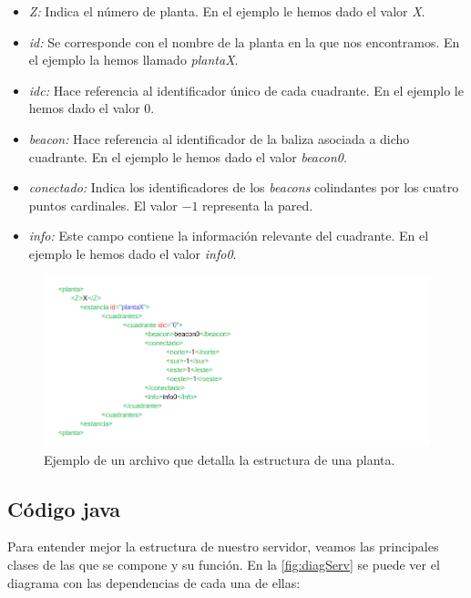 \begin{itemize}
	\item \textit{Z:} Indica el número de planta. En el ejemplo le hemos dado el valor \textit{X}.
	\item \textit{id:} Se corresponde con el nombre de la planta en la que nos encontramos. En el ejemplo la hemos llamado \textit{plantaX}.
	\item \textit{idc:} Hace referencia al identificador único de cada cuadrante. En el ejemplo le hemos dado el valor $0$.
	\item \textit{beacon:} Hace referencia al identificador de la baliza asociada a dicho cuadrante. En el ejemplo le hemos dado el valor \textit{beacon0}.
	\item \textit{conectado:} Indica los identificadores de los \textit{beacons} colindantes por los cuatro puntos cardinales. El valor $-1$ representa la pared.
	\item \textit{info:} Este campo contiene la información relevante del cuadrante. En el ejemplo le hemos dado el valor \textit{info0}.
	
\end{itemize}

\begin{figure}[t]
	\centering
	\includegraphics[width=1.1\textwidth]{Imagenes/Capitulo4/XMLPLANTA}
	\caption{Ejemplo de un archivo que detalla la estructura de una planta.}
	\label{fig:xmlplanta}
\end{figure}



\subsection{Código java}
Para entender mejor la estructura de nuestro servidor, veamos las principales clases de las que se compone y su función. En la \ref{fig:diagServ} se puede ver el diagrama con las dependencias de cada una de ellas:

